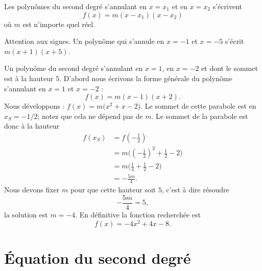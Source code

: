 \begin{Aretenir}
    Les polynômes du second degré s'annulant en \( x=x_1\) et en \( x=x_2\) s'écrivent 
    \begin{equation}
        f(x)=m(x-x_1)(x-x_2)
    \end{equation}
    où \( m\) est n'importe quel réel.
\end{Aretenir}

Attention aux signes. Un polynôme qui s'annule en \( x=-1\) et \( x=-5\) s'écrit \( m(x+1)(x+5)\).

\begin{example}
    Un polynôme du second degré s'annulant en \( x=1\), en \( x=-2\) et dont le sommet est à la hauteur \( 5\). D'abord nous écrivons la forme générale du polynôme s'annulant en \( x=1\) et \( x=-2\) :
    \begin{equation}
        f(x)=m(x-1)(x+2).
    \end{equation}
    Nous développons : \( f(x)=m\big( x^2+x-2 \big)\). Le sommet de cette parabole est en \( x_S=-1/2\); notez que cela ne dépend pas de \( m\). Le sommet de la parabole est donc à la hauteur
    \begin{subequations}
        \begin{align}
            f(x_S)&=f\left( -\frac{ 1 }{2} \right)\\
            &=m\Big( \left( -\frac{ 1 }{2} \right)^2+\frac{ 1 }{2}-2 \Big)\\
            &=m\Big( \frac{1}{ 4 }+\frac{1}{ 2 }-2 \Big)\\
            &=-\frac{ 5m }{ 4 }.
        \end{align}
    \end{subequations}
    Nous devons fixer \( m\) pour que cette hauteur soit \( 5\), c'est à dire résoudre
    \begin{equation}
        -\frac{ 5m }{ 4 }=5,
    \end{equation}
    la solution est \( m=-4\). En définitive la fonction recherchée est
    \begin{equation}
        f(x)=-4x^2+4x-8.
    \end{equation}
\end{example}

\section{Équation du second degré}

